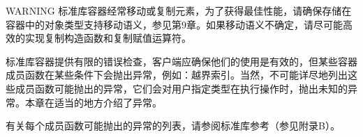 \begin{myWarning}{WARNING}
标准库容器经常移动或复制元素，为了获得最佳性能，请确保存储在容器中的对象类型支持移动语义，参见第9章。如果移动语义不确定，请尽可能高效的实现复制构造函数和复制赋值运算符。
\end{myWarning}


标准库容器提供有限的错误检查，客户端应确保他们的使用是有效的，但某些容器成员函数在某些条件下会抛出异常，例如：越界索引。当然，不可能详尽地列出这些成员函数可能抛出的异常，它们会对用户指定类型在执行操作时，抛出未知的异常。本章在适当的地方介绍了异常。

有关每个成员函数可能抛出的异常的列表，请参阅标准库参考（参见附录B）。












